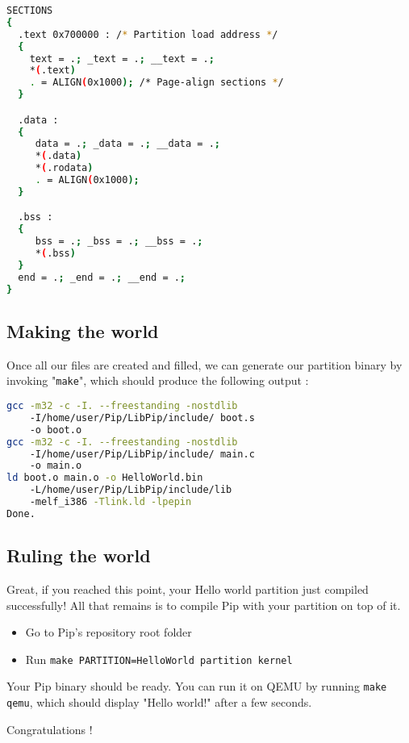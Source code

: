 \documentclass[10pt,a4paper,titlepage]{refart}
\begin{document}
\begin{lstlisting}[language=bash,caption={link.ld sections}]
SECTIONS
{
  .text 0x700000 : /* Partition load address */
  {
    text = .; _text = .; __text = .;
    *(.text)
    . = ALIGN(0x1000); /* Page-align sections */
  }

  .data :
  {
     data = .; _data = .; __data = .;
     *(.data)
     *(.rodata)
     . = ALIGN(0x1000);
  }

  .bss :
  {
     bss = .; _bss = .; __bss = .;
     *(.bss)
  }
  end = .; _end = .; __end = .;
}
\end{lstlisting}

\subsection{Making the world}
Once all our files are created and filled, we can generate our partition binary by invoking "\texttt{make}", which should produce the following output :
\begin{lstlisting}[language=bash,caption={Partition make output}]
gcc -m32 -c -I. --freestanding -nostdlib 
	-I/home/user/Pip/LibPip/include/ boot.s 
	-o boot.o
gcc -m32 -c -I. --freestanding -nostdlib
	-I/home/user/Pip/LibPip/include/ main.c
	-o main.o
ld boot.o main.o -o HelloWorld.bin 
	-L/home/user/Pip/LibPip/include/lib
	-melf_i386 -Tlink.ld -lpepin
Done.
\end{lstlisting}

\subsection{Ruling the world}
Great, if you reached this point, your Hello world partition just compiled successfully! All that remains is to compile Pip with your partition on top of it.
\begin{itemize}
\item Go to Pip's repository root folder
\item Run \texttt{make PARTITION=HelloWorld partition kernel}
\end{itemize}

Your Pip binary should be ready. You can run it on QEMU by running \texttt{make qemu}, which should display "Hello world!" after a few seconds. 

Congratulations !
\end{document}
